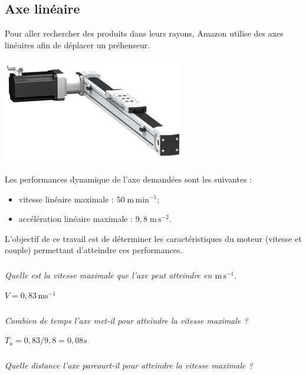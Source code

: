 \documentclass[10pt,fleqn]{article} %
\begin{document}
\begin{multicols}{2}
\section*{Axe linéaire}
\setcounter{exo}{0}
Pour aller rechercher des produits dans leurs rayons, Amazon utilise des axes linéaires afin de déplacer un préhenseur.
\begin{center}
\includegraphics[width=\linewidth]{images/fig_11}
\end{center}

Les performances dynamique de l'axe demandées sont les suivantes : 
\begin{itemize}
\item vitesse linéaire maximale : $50 \; \text{m}\,\text{min}^{-1}$;
\item accélération linéaire maximale : $9,8 \; \text{m}\, \text{s}^{-2}$.
\end{itemize}

\begin{obj}
L'objectif de ce travail est de déterminer les caractéristiques du moteur (vitesse et couple) permettant d'atteindre ces performances.
\end{obj}

\subparagraph{}
\textit{Quelle est la vitesse maximale que l'axe peut atteindre en  $\text{m}\, \text{s}^{-1}$.}
\ifprof
\begin{corrige}
$V = 0,83 \, \text{ms}^{-1}$
\end{corrige}
\else
\fi

\subparagraph{}
\textit{Combien de temps l'axe met-il pour atteindre la vitesse maximale ?}
\ifprof
\begin{corrige}
$T_a =0,83/9,8 = 0,08 s$
\end{corrige}
\else
\fi

\subparagraph{}
\textit{Quelle distance l'axe parcourt-il pour atteindre la vitesse maximale ?}
\ifprof
\begin{corrige}
\end{corrige}
\else
\fi



\end{multicols}
\end{document}

